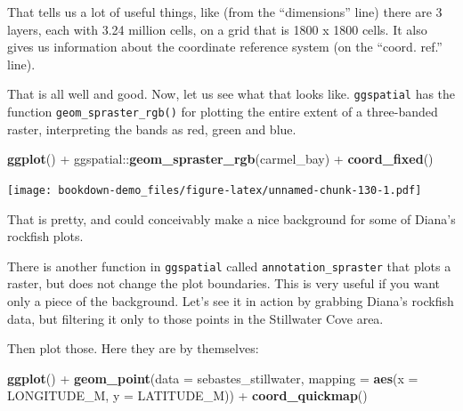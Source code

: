 \documentclass[]{book}
\newenvironment{Shaded}{\begin{snugshade}}{\end{snugshade}}
\newcommand{\KeywordTok}[1]{\textcolor[rgb]{0.13,0.29,0.53}{\textbf{{#1}}}}
\newcommand{\DataTypeTok}[1]{\textcolor[rgb]{0.13,0.29,0.53}{{#1}}}
\newcommand{\FloatTok}[1]{\textcolor[rgb]{0.00,0.00,0.81}{{#1}}}
\newcommand{\StringTok}[1]{\textcolor[rgb]{0.31,0.60,0.02}{{#1}}}
\newcommand{\NormalTok}[1]{{#1}}
\theoremstyle{definition}
\theoremstyle{definition}
\theoremstyle{remark}
\begin{document}
That tells us a lot of useful things, like (from the ``dimensions''
line) there are 3 layers, each with 3.24 million cells, on a grid that
is 1800 x 1800 cells. It also gives us information about the coordinate
reference system (on the ``coord. ref.'' line).

That is all well and good. Now, let us see what that looks like.
\texttt{ggspatial} has the function \texttt{geom\_spraster\_rgb()} for
plotting the entire extent of a three-banded raster, interpreting the
bands as red, green and blue.

\begin{Shaded}
\begin{Highlighting}[]
\KeywordTok{ggplot}\NormalTok{() +}
\StringTok{  }\NormalTok{ggspatial::}\KeywordTok{geom_spraster_rgb}\NormalTok{(carmel_bay) +}
\StringTok{  }\KeywordTok{coord_fixed}\NormalTok{()}
\end{Highlighting}
\end{Shaded}

\texttt{[image: bookdown-demo\_files/figure-latex/unnamed-chunk-130-1.pdf]}

That is pretty, and could conceivably make a nice background for some of
Diana's rockfish plots.

There is another function in \texttt{ggspatial} called
\texttt{annotation\_spraster} that plots a raster, but does not change
the plot boundaries. This is very useful if you want only a piece of the
background. Let's see it in action by grabbing Diana's rockfish data,
but filtering it only to those points in the Stillwater Cove area.

\begin{Shaded}
\end{Shaded}

Then plot those. Here they are by themselves:

\begin{Shaded}
\begin{Highlighting}[]
\KeywordTok{ggplot}\NormalTok{() +}
\StringTok{  }\KeywordTok{geom_point}\NormalTok{(}\DataTypeTok{data =} \NormalTok{sebastes_stillwater, }\DataTypeTok{mapping =} \KeywordTok{aes}\NormalTok{(}\DataTypeTok{x =} \NormalTok{LONGITUDE_M, }\DataTypeTok{y =} \NormalTok{LATITUDE_M)) +}
\StringTok{  }\KeywordTok{coord_quickmap}\NormalTok{()}
\end{Highlighting}
\end{Shaded}
\end{document}
